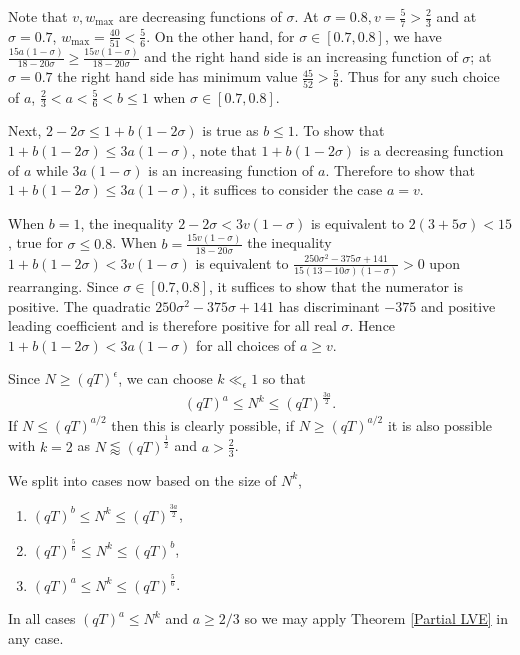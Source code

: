 \documentclass[12pt]{amsart}
\theoremstyle{definition}
\theoremstyle{plain}
\theoremstyle{remark}
\numberwithin{equation}{section}
\numberwithin{theorem}{section}
\numberwithin{equation}{section}
\begin{document}
	Note that $v,w_{\max}$ are decreasing functions of $\sigma$. At $\sigma = 0.8, v = \frac{5}{7} > \frac{2}{3}$ and at $\sigma = 0.7$, $w_{\max} = \frac{40}{51} < \frac{5}{6}$. On the other hand, for $\sigma \in [0.7,0.8]$, we have $\frac{15a(1-\sigma)}{18-20\sigma} \geq \frac{15v(1-\sigma)}{18-20\sigma}$ and the right hand side is an increasing function of $\sigma$; at $\sigma =0.7$ the right hand side has minimum value $\frac{45}{52} > \frac{5}{6}$. Thus for any such choice of $a$, $\frac{2}{3}<a<\frac{5}{6}<b\leq 1$ when $\sigma \in [0.7,0.8]$.
	
	Next, $2-2\sigma \leq 1+b(1-2\sigma)$ is true as $b \leq 1$. To show that $1+b(1-2\sigma) \leq 3a(1-\sigma)$, note that $1+b(1-2\sigma)$ is a decreasing function of $a$ while $3a(1-\sigma)$ is an increasing function of $a$. Therefore to show that $1+b(1-2\sigma) \leq 3a(1-\sigma)$, it suffices to consider the case $a=v$. 
	
	When $b=1$, the inequality $2-2\sigma < 3v(1-\sigma)$ is equivalent to $2(3+5\sigma) < 15$, true for $\sigma \leq 0.8$. When $b = \frac{15v(1-\sigma)}{18-20\sigma}$ the inequality $1+b(1-2\sigma) < 3v(1-\sigma)$ is equivalent to $\frac{250\sigma^2-375\sigma+141}{15(13-10\sigma)(1-\sigma)} > 0$ upon rearranging. Since $\sigma\in[0.7,0.8]$, it suffices to show that the numerator is positive.
	The quadratic $250\sigma^2-375\sigma+141$ has discriminant $-375$ and positive
	leading coefficient and is therefore positive for all real $\sigma$. Hence
	$1+b(1-2\sigma)<3a(1-\sigma)$
	for all choices of $a\geq v$.
	
	Since $N \geq (qT)^{\epsilon}$, we can choose $k \ll_{\epsilon} 1$ so that 
	\begin{align*}
		(qT)^{a} \leq N^k \leq (qT)^{\frac{3a}{2}}.
	\end{align*}
	If $N \leq (qT)^{a/2}$ then this is clearly possible, if $N \geq (qT)^{a/2}$ it is also possible with $k=2$ as $N \lessapprox(qT)^{\frac{1}{2}}$ and $a > \frac{2}{3}$.
	
	We split into cases now based on the size of $N^k$,
	\begin{enumerate}
		\item[1] $(qT)^b \leq  N^k \leq (qT)^{\frac{3a}{2}} $,
		\item[2] $(qT)^{\frac{5}{6}} \leq N^k \leq (qT)^b$,
		\item[3] $(qT)^{a} \leq N^k \leq (qT)^{\frac{5}{6}}$.
	\end{enumerate}
	In all cases $(qT)^a \leq N^k$ and $a \geq 2/3$ so we may apply Theorem \ref{Partial LVE} in any case. 
	
\end{document}
